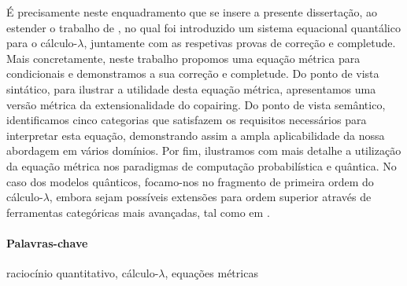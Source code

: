 É precisamente neste enquadramento que se insere a presente dissertação, ao estender o trabalho de \cite{dahlqvist2023syntactic}, no qual foi introduzido um sistema equacional quantálico para o cálculo-$\lambda$, juntamente com as respetivas provas de correção e completude. Mais concretamente, neste trabalho propomos uma equação métrica para condicionais e demonstramos a sua correção e completude.
Do ponto de vista sintático, para ilustrar a utilidade desta equação métrica, apresentamos uma versão métrica da extensionalidade do copairing.  Do ponto de vista semântico, identificamos cinco categorias que satisfazem os requisitos necessários para interpretar esta equação, demonstrando assim a ampla aplicabilidade da nossa abordagem em vários domínios. Por fim, ilustramos com mais detalhe a utilização da equação métrica nos paradigmas de computação probabilística e quântica. No caso dos modelos quânticos, focamo-nos no fragmento de primeira ordem do cálculo-$\lambda$, embora sejam possíveis extensões para ordem superior através de ferramentas categóricas mais avançadas, tal como em \cite{dahlqvist2023syntactic}.






\paragraph{Palavras-chave} raciocínio quantitativo, cálculo-$\lambda$, equações métricas


\cleardoublepage
